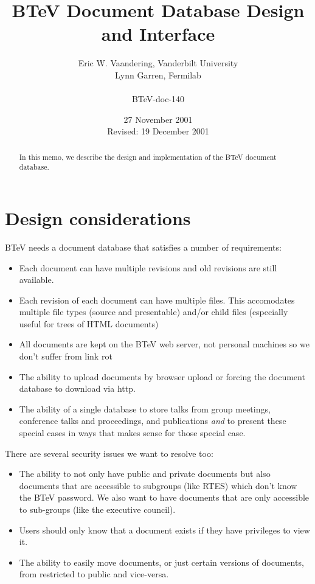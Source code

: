 \documentclass[12pt]{article}
\begin{document}
                                                 

\title{BTeV Document Database Design and Interface}

\author{
        Eric W. Vaandering, Vanderbilt University\\
        Lynn Garren, Fermilab\\
        \\
        {BTeV-doc-140}
       }
        

\date{27 November 2001 \\
      Revised: 19 December 2001}

\maketitle

\begin{abstract} 
In this memo, we describe the design and implementation of the BTeV document
database.
\end{abstract}

\section{Design considerations}

BTeV needs a document database that satisfies a number of requirements:
\begin{itemize}
\item{Each document can have multiple revisions and old revisions are still
available.}
\item{Each revision of each document can have multiple files. This accomodates
multiple file types (source and  presentable) and/or child files (especially
useful for trees of HTML  documents)}
\item{All documents are kept on the BTeV web server, not personal machines 
so we don't suffer from link rot}
\item{The ability to upload documents by browser upload or forcing the 
document database to download via http.}
\item{The ability of a single database to store talks from group meetings,
conference talks and proceedings, and publications \emph{and} to present these
special cases in ways that makes sense for those special case.}
\end{itemize}

There are several security issues we want to resolve too:
\begin{itemize}
\item{The ability to not only have public and private documents but also 
documents that are accessible to subgroups (like RTES) which don't know 
the BTeV password. We also want to have documents that are only 
accessible to sub-groups (like the executive council).}
\item{Users should only know that a document exists if they have 
privileges to view it.}
\item{The ability to easily move documents, or just certain versions of 
documents, from restricted to public and vice-versa.}
\end{itemize}
\end{document}
